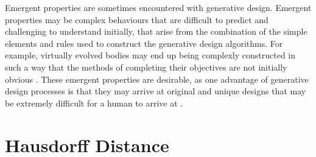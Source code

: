 Emergent properties are sometimes encountered with generative design. Emergent properties may be complex behaviours that are difficult to predict \citep{Aiguier2008} and challenging to understand initially, that arise from the combination of the simple elements and rules used to construct the generative design algorithms. For example, virtually evolved bodies may end up being complexly constructed in such a way that the methods of completing their objectives are not initially obvious \citep{Damper2000}. These emergent properties are desirable, as one advantage of generative design processes is that they may arrive at original and unique designs that may be extremely difficult for a human to arrive at \citep{Sims1994a}. 

\section{Hausdorff Distance}
\label{sec:HD}

